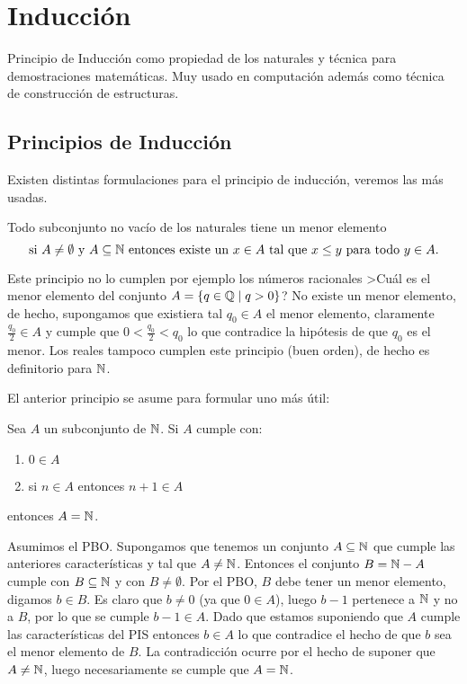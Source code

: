 \section{Inducción}

Principio de Inducción como propiedad de los naturales y técnica para demostraciones matemáticas.
Muy usado en computación además como técnica de construcción de estructuras.

\subsection{Principios de Inducción}
Existen distintas formulaciones para el principio de inducción, veremos las más usadas.

\begin{teorema}\label{teo:PBO}
Todo subconjunto no vacío de los naturales tiene un menor elemento\\
\[
\text{si }A\not=\emptyset \text{ y } A\subseteq \mathbb{N}\text{ entonces existe un }x\in A \text{ tal que } x\leq y \text{ para todo }y\in A. 
\]
\end{teorema}

Este principio no lo cumplen por ejemplo los números racionales
>Cuál es el menor elemento del conjunto $A=\{q\in \mathbb{Q}\;|\; q>0\}$? 
No existe un menor elemento, de hecho, supongamos que existiera tal $q_0\in A$ el menor elemento, claramente $\frac{q_0}{2}\in A$ y cumple que $0<\frac{q_0}{2}<q_0$ lo que contradice la hipótesis de que $q_0$ es el menor.
Los reales tampoco cumplen este principio (buen orden), de hecho es definitorio para $\mathbb{N}$.

El anterior principio se asume para formular uno más útil:

\begin{teorema}
Sea $A$ un subconjunto de $\mathbb{N}$. Si $A$ cumple con:
\begin{enumerate}
  \item $0\in A$
  \item si $n\in A$ entonces $n+1\in A$
\end{enumerate}
entonces $A=\mathbb{N}$.

\begin{demostracion}
Asumimos el PBO.
Supongamos que tenemos un conjunto $A\subseteq\mathbb{N}$ que cumple las anteriores características y tal que $A\not=\mathbb{N}$.
Entonces el conjunto $B=\mathbb{N}-A$ cumple con $B\subseteq\mathbb{N}$ y con $B\not=\emptyset$.
Por el PBO, $B$ debe tener un menor elemento, digamos $b\in B$.
Es claro que $b\not=0$ (ya que $0\in A$), luego $b-1$ pertenece a $\mathbb{N}$ y no a $B$, por lo que se cumple $b-1\in A$.
Dado que estamos suponiendo que $A$ cumple las características del PIS entonces $b\in A$ lo que contradice el hecho de que $b$ sea el menor elemento de $B$.
La contradicción ocurre por el hecho de suponer que $A\not=\mathbb{N}$, luego necesariamente se cumple que $A=\mathbb{N}$.
\end{demostracion}
\end{teorema}

